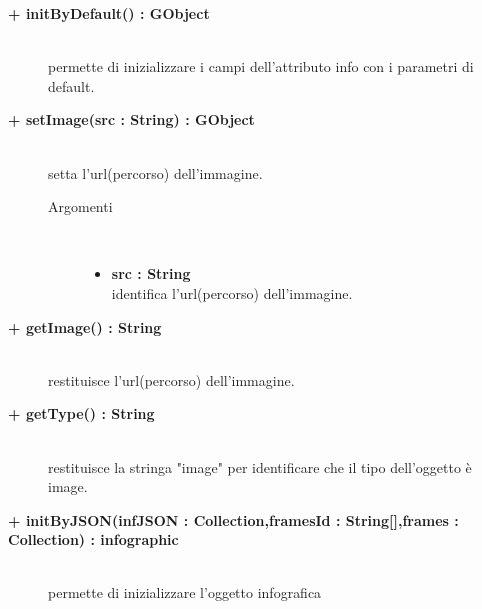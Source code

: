 \begin{description}
\begin{description}
\end{description}

\begin{description}
		\item[\textbf{\color{blue}+ initByDefault() : GObject			}] \hfill \\
			permette di inizializzare i campi dell'attributo info con i parametri di default. 

\end{description}

\begin{description}
		\item[\textbf{\color{blue}+ setImage(src : String) : GObject			}] \hfill \\
			setta l'url(percorso) dell'immagine. 
			
		\begin{description}
			\item[Argomenti] \hfill \\
				\begin{itemize}
				
					\item \textbf{src : String			} \hfill \\
					identifica l'url(percorso) dell'immagine.
				\end{itemize}
		\end{description}

\end{description}

\begin{description}
		\item[\textbf{\color{blue}+ getImage() : String			}] \hfill \\
			restituisce l'url(percorso) dell'immagine. 

\end{description}

\begin{description}
		\item[\textbf{\color{blue}+ getType() : String			}] \hfill \\
			restituisce la stringa "image" per identificare che il tipo dell'oggetto è image. 

\end{description}

\begin{description}
		\item[\textbf{\color{blue}+ initByJSON(infJSON : Collection,framesId : String[],frames : Collection) : infographic			}] \hfill \\
			permette di inizializzare l'oggetto infografica 
			

\end{description}
\end{description}
